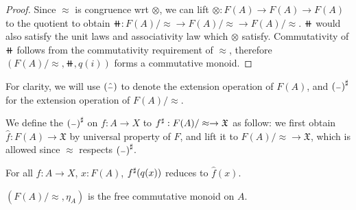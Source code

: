 \begin{proof}
Since $\approx$ is congruence wrt $\otimes$,
we can lift $\otimes : F(A) \to F(A) \to F(A)$ to the quotient to obtain
$\doubleplus : F(A) / \approx \to F(A) / \approx \to F(A) / \approx$.
$\doubleplus$ would also satisfy the unit laws and associativity law which $\otimes$ satisfy.
Commutativity of $\doubleplus$ follows from the commutativity requirement of $\approx$,
therefore $(F(A) / \approx, \doubleplus, q(i))$ forms a commutative monoid.
\end{proof}

For clarity, we will use $(\hat{{\scriptstyle{-}}})$ to denote the extension operation of $F(A)$, 
and ${({\scriptstyle{-}})}^{\sharp}$ for the extension operation of $F(A) / \approx$.

\begin{definition}
We define the ${({\scriptstyle{-}})}^{\sharp}$ on $f : A \to X$ to ${f}^{\sharp} : F(A) / \approx \to \mathfrak{X}$ as follow:
we first obtain $\hat{f} : F(A) \to \mathfrak{X}$ by universal property of $F$, and lift it
to $F(A) / \approx \to \mathfrak{X}$, which is allowed since $\approx$ respects ${({\scriptstyle{-}})}^{\sharp}$.
\end{definition}

\begin{lemma}
    For all $f : A \to X$, $x : F(A)$, ${f}^{\sharp}(q(x))$ reduces to $\hat{f}(x)$.
\end{lemma}

\begin{proposition}
    $(F(A) / \approx,\eta_A)$ is the free commutative monoid on $A$.
\end{proposition}

